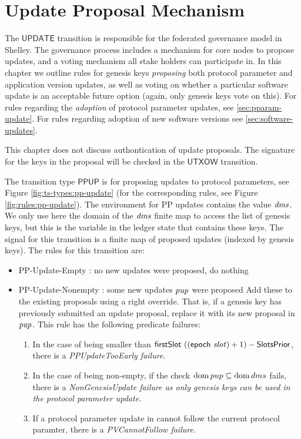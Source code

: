 \section{Update Proposal Mechanism}
\label{sec:update}


The $\mathsf{UPDATE}$ transition is responsible for the federated governance model in Shelley.
The governance process includes a mechanism for core nodes to propose updates, and
a voting mechanism all stake holders can participate in. In this chapter we
outline rules for genesis keys \textit{proposing} both protocol parameter
and application version updates, as well as voting on whether a particular
software update is an acceptable future option (again, only genesis keys vote on this).
For rules regarding the \textit{adoption} of protocol
parameter updates, see \ref{sec:pparam-update}. For rules regarding
adoption of new software versions see \ref{sec:software-updates}.

This chapter does not discuss authontication of update proposals.
The signature for the keys in the proposal will be checked in the
$\mathsf{UTXOW}$ transition.

The transition type $\mathsf{PPUP}$ is for proposing updates to protocol
parameters, see Figure \ref{fig:ts-types:pp-update} (for the corresponding rules,
see Figure \ref{fig:rules:pp-update}). The environment for PP updates contains
the value $\mathit{dms}$. We only use here the domain of the $\mathit{dms}$ finite map
to access the list of genesis keys,
but this is the variable in the ledger state that contains these keys.
The signal for this transition is a finite map of proposed updates (indexed by
genesis keys). The rules for this transition
are:

\begin{itemize}
  \item PP-Update-Empty : no new updates were proposed, do nothing
  \item PP-Update-Nonempty : some new updates $\mathit{pup}$ were proposed
  Add these to
  the existing proposals using a right override. That is, if a genesis key
  has previously submitted an update proposal, replace it with its new
  proposal in $\mathit{pup}$. This rule has the following predicate failures:

  \begin{enumerate}
  \item In the case of  being smaller than
    $\mathsf{firstSlot}~((\mathsf{epoch}~\mathit{slot}) + 1) - \mathsf{SlotsPrior}$, there is
    a \em{PPUpdateTooEarly} failure.
  \item In the case of  being non-empty, if the check $\operatorname{dom} pup \subseteq
    \operatorname{dom} dms$ fails, there is a \em{NonGenesisUpdate} failure as only genesis keys
    can be used in the protocol parameter update.
  \item If a protocol parameter update in  cannot follow the current
    protocol paramter, there is a \em{PVCannotFollow} failure.
  \end{enumerate}
\end{itemize}

